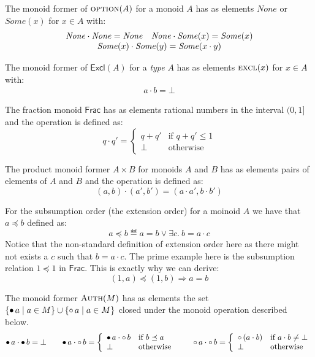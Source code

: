 \documentclass[]{scrartcl}
\newcommand{\None}{\mathit{None}}
\newcommand{\Some}{\mathit{Some}}
\newcommand{\option}{\textmon{option}}
\newcommand{\Excl}{\textsf{Excl}}
\newcommand{\excl}{\textmon{excl}}
\newcommand{\Frac}{\textsf{Frac}}
\begin{document}
The monoid former of $\option(A)$ for a monoid $A$ has as elements 
$\None$ or $\Some(x)$ for $x \in A$ with:
\[
\begin{array}{ll}
\None \cdot \None = \None & \None \cdot \Some(x) = \Some(x) \\
\multicolumn{2}{c}{\Some(x) \cdot \Some(y) = \Some(x \cdot y)}
\end{array}
\]

The monoid former of $\Excl(A)$ for a \emph{type} $A$ has as elements 
$\excl(x)$ for $x \in A$ with:
\[
\begin{array}{ll}
a \cdot b = \bot
\end{array}
\]

The fraction monoid $\Frac$ has as elements rational numbers in the interval $(0, 1]$ and the operation is defined as:
\[
q \cdot q' = \left\{
\begin{array}{ll}
q + q' & \text{if } q + q' \le 1\\
\bot & \text{otherwise}
\end{array}
\right.
\]

The product monoid former $A \times B$ for monoids $A$ and $B$ has as elements pairs of elements of $A$ and $B$ and the operation is defined as:
\[
(a, b) \cdot (a', b') = (a \cdot a', b \cdot b')
\]

For the subsumption order (the extension order) for a moinoid $A$ we have that $a \preceq b$ defined as:
\[
a \preceq b \eqdef a = b \lor \exists c.~b = a \cdot c
\]
Notice that the non-standard definition of extension order here as
there might not exists a $c$ such that $b = a \cdot c$.
The prime example here is the subsumption relation $1 \preceq 1$ in
$\Frac$.
This is exactly why we can derive:
\[
(1, a) \preceq (1, b) \Rightarrow a = b
\]

The monoid former $\textsc{Auth}(M)$ has as elements the set
$\{\mathord{\bullet}\, a \mid a \in M\} \cup \{\mathord{\circ}\, a \mid a \in M\}$
closed under the monoid operation described below.
\[
\mathord{\bullet}\, a \cdot \mathord{\bullet}\, b = \bot
\hspace{2em}
\mathord{\bullet}\, a \cdot \mathord{\circ}\, b =
\left\{
\begin{array}{ll}
\mathord{\bullet}\, a \cdot \mathord{\circ}\, b & \text{if } b \preceq a\\
\bot & \text{otherwise}
\end{array}
\right.
\hspace{2em}
\mathord{\circ}\, a \cdot \mathord{\circ}\, b =
\left\{
\begin{array}{ll}
\mathord{\circ}\, (a \cdot b) & \text{if } a \cdot b \neq \bot\\
\bot & \text{otherwise}
\end{array}
\right.
\]
\end{document}
